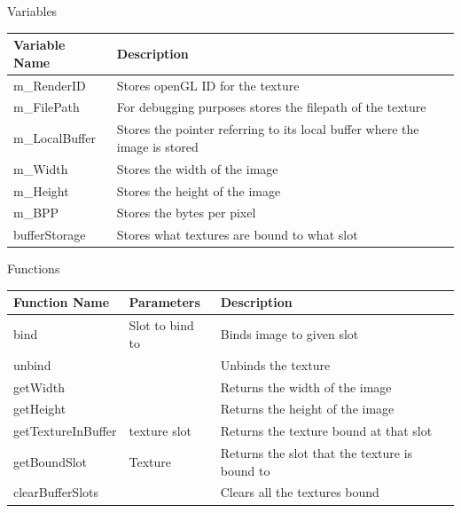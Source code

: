 \documentclass{article}
\begin{document}
                \begin{center}
                    Variables
                    \begin{tabular}{ | m{} | m{} | }
                        \hline
                        \textbf{Variable Name} & \textbf{Description} \\
                        \hline
                        m\_RenderID & Stores openGL ID for the texture \\
                        \hline
                        m\_FilePath & For debugging purposes stores the filepath of the texture \\
                        \hline
                        m\_LocalBuffer & Stores the pointer referring to its local buffer where the image is stored \\
                        \hline
                        m\_Width & Stores the width of the image \\
                        \hline
                        m\_Height & Stores the height of the image \\
                        \hline
                        m\_BPP & Stores the bytes per pixel \\
                        \hline
                        bufferStorage & Stores what textures are bound to what slot \\
                        \hline
                    \end{tabular}
                    Functions
                    \begin{tabular}{ | m{} | m{}| m{} | }
                        \hline
                        \textbf{Function Name} & \textbf{Parameters} & \textbf{Description} \\
                        \hline
                        bind & Slot to bind to & Binds image to given slot \\
                        \hline
                        unbind & & Unbinds the texture \\
                        \hline
                        getWidth & & Returns the width of the image \\
                        \hline
                        getHeight & & Returns the height of the image \\
                        \hline
                        getTextureInBuffer & texture slot & Returns the texture bound at that slot  \\
                        \hline
                        getBoundSlot & Texture & Returns the slot that the texture is bound to \\
                        \hline
                        clearBufferSlots & & Clears all the textures bound \\
                        \hline
                    \end{tabular}
                \end{center}
\end{document}
